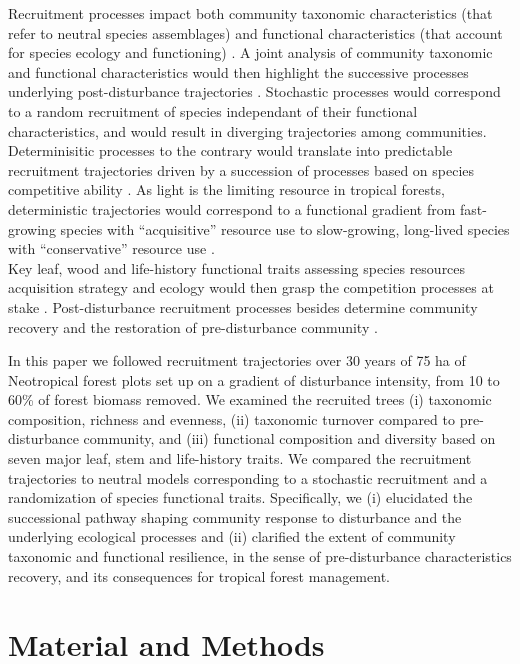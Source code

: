 \documentclass[fleqn,10pt]{ArtEcoFoG} %
\begin{document}
Recruitment processes impact both community taxonomic characteristics
(that refer to neutral species assemblages) and functional
characteristics (that account for species ecology and functioning)
\citep{Macarthur1967, Violle2007b, Kunstler2016}. A joint analysis of
community taxonomic and functional characteristics would then highlight
the successive processes underlying post-disturbance trajectories
\citep{Fukami2005, Chalmandrier2015, Cequinel2018}. Stochastic processes
would correspond to a random recruitment of species independant of their
functional characteristics, and would result in diverging trajectories
among communities. Determinisitic processes to the contrary would
translate into predictable recruitment trajectories driven by a
succession of processes based on species competitive ability
\citep{Rees2001, Perronne2017}. As light is the limiting resource in
tropical forests, deterministic trajectories would correspond to a
functional gradient from fast-growing species with ``acquisitive''
resource use to slow-growing, long-lived species with ``conservative''
resource use \citep{Denslow1980, Molino2001, Bongers2009}.\\
Key leaf, wood and life-history functional traits assessing species
resources acquisition strategy and ecology would then grasp the
competition processes at stake
\citep{Wright2004, Chave2009b, Herault2011}. Post-disturbance
recruitment processes besides determine community recovery and the
restoration of pre-disturbance community
\citep{Clements1916, Diamond1975}.

In this paper we followed recruitment trajectories over 30 years of 75
ha of Neotropical forest plots set up on a gradient of disturbance
intensity, from 10 to 60\% of forest biomass removed. We examined the
recruited trees (i) taxonomic composition, richness and evenness, (ii)
taxonomic turnover compared to pre-disturbance community, and (iii)
functional composition and diversity based on seven major leaf, stem and
life-history traits. We compared the recruitment trajectories to neutral
models corresponding to a stochastic recruitment and a randomization of
species functional traits. Specifically, we (i) elucidated the
successional pathway shaping community response to disturbance and the
underlying ecological processes and (ii) clarified the extent of
community taxonomic and functional resilience, in the sense of
pre-disturbance characteristics recovery, and its consequences for
tropical forest management.

\section{Material and Methods}\label{material-and-methods}
\end{document}
